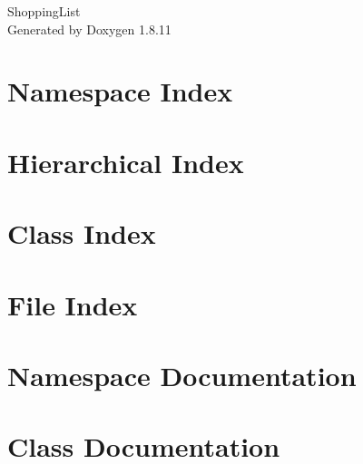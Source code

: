 \documentclass[twoside]{book}
\newcommand{\+}{\discretionary{\mbox{\scriptsize$\hookleftarrow$}}{}{}}
\newcommand{\clearemptydoublepage}{%
  \newpage{\pagestyle{empty}\cleardoublepage}%
}
\begin{document}
\hypersetup{pageanchor=false,
             bookmarksnumbered=true,
             pdfencoding=unicode
            }
\begin{titlepage}
\vspace*{7cm}
\begin{center}%
{\Large Shopping\+List }\\
\vspace*{1cm}
{\large Generated by Doxygen 1.8.11}\\
\end{center}
\end{titlepage}
\clearemptydoublepage
\tableofcontents
\clearemptydoublepage
{}
\hypersetup{pageanchor=true}

\chapter{Namespace Index}

\chapter{Hierarchical Index}

\chapter{Class Index}

\chapter{File Index}

\chapter{Namespace Documentation}




\chapter{Class Documentation}















\end{document}
